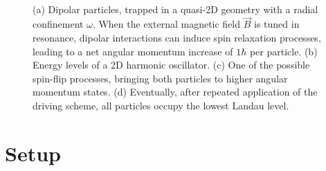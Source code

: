 \begin{figure}[ht]
    \centering
    \\
    \caption{(a) Dipolar particles, trapped in a quasi-2D geometry with a radial confinement $\omega$. When the external magnetic field $\vec{B}$ is tuned in resonance, dipolar interactions \Vdd can induce spin relaxation processes, leading to a net angular momentum increase of $1\hbar$ per particle. (b) Energy levels of a 2D harmonic oscillator. (c) One of the possible spin-flip processes, bringing both particles to higher angular momentum states. (d) Eventually, after repeated application of the driving scheme, all particles occupy the lowest Landau level.}
\end{figure}

\section{Setup}

